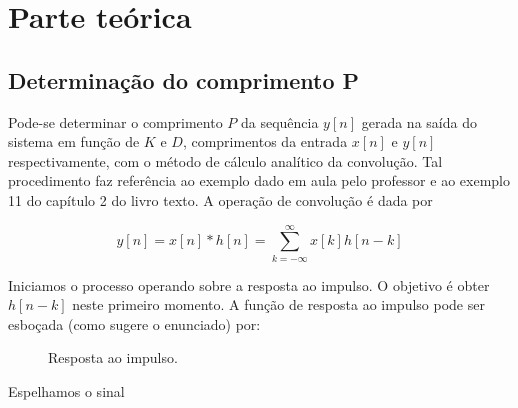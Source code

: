 \documentclass[a4paper,12pt]{article}
\begin{document}
\section*{Parte teórica}

\subsection*{Determinação do comprimento P}

Pode-se determinar o comprimento $P$ da sequência $y[n]$ gerada na saída do sistema em função de $K$ e $D$, comprimentos da entrada $x[n]$ e $y[n]$ respectivamente, com o método de cálculo analítico da convolução. Tal procedimento faz referência ao exemplo dado em aula pelo professor e ao exemplo 11 do capítulo 2 do  livro texto. A operação de convolução é dada por

\begin{equation}
  y[n]=x[n]*h[n]=\sum_{k=-\infty}^{\infty}{x[k]h[n-k]}
\end{equation}

Iniciamos o processo operando sobre a resposta ao impulso. O objetivo é obter $h[n-k]$ neste primeiro momento. A função de resposta ao impulso pode ser esboçada (como sugere o enunciado) por:

\begin{figure}[H]
  \centering
  \caption{Resposta ao impulso.}
  \label{fig:impulse_respose}
\end{figure}

Espelhamos o sinal
\end{document}
